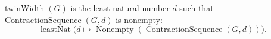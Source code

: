 \(\operatorname{twinWidth}(G)\) is the least natural number \(d\) such that
\(\operatorname{ContractionSequence}(G,d)\) is nonempty:
\[
  \operatorname{leastNat}\bigl(d\mapsto
    \operatorname{Nonempty}(\operatorname{ContractionSequence}(G,d))\bigr).
\]
